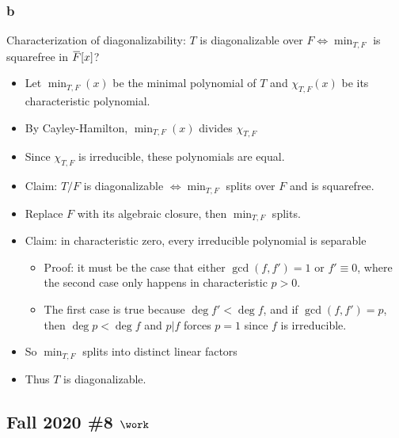 \begin{solution}
\hypertarget{b-96}{%
\subsubsection{b}\label{b-96}}

Characterization of diagonalizability: \(T\) is diagonalizable over
\(F \iff \min_{T, F}\) is squarefree in
\(\mkern 1.5mu\overline{\mkern-1.5muF\mkern-1.5mu}\mkern 1.5mu[x]\)?

\begin{itemize}
\tightlist
\item
  Let \(\min_{T, F}(x)\) be the minimal polynomial of \(T\) and
  \(\chi_{T, F}(x)\) be its characteristic polynomial.
\item
  By Cayley-Hamilton, \(\min_{T, F}(x)\) divides \(\chi_{T, F}\)
\item
  Since \(\chi_{T, F}\) is irreducible, these polynomials are equal.
\item
  Claim: \(T/F\) is diagonalizable \(\iff \min_{T, F}\) splits over
  \(F\) and is squarefree.
\item
  Replace \(F\) with its algebraic closure, then \(\min_{T, F}\) splits.
\item
  Claim: in characteristic zero, every irreducible polynomial is
  separable

  \begin{itemize}
  \tightlist
  \item
    Proof: it must be the case that either \(\gcd(f, f') = 1\) or
    \(f' \equiv 0\), where the second case only happens in
    characteristic \(p>0\).
  \item
    The first case is true because \(\deg f' < \deg f\), and if
    \(\gcd(f, f') = p\), then \(\deg p < \deg f\) and
    \(p\mathrel{\Big|}f\) forces \(p=1\) since \(f\) is irreducible.
  \end{itemize}
\item
  So \(\min_{T, F}\) splits into distinct linear factors
\item
  Thus \(T\) is diagonalizable.
\end{itemize}

\end{solution}

\hypertarget{fall-2020-8-work}{%
\subsection{\texorpdfstring{Fall 2020 \#8
\(\work\)}{Fall 2020 \#8 \textbackslash work}}\label{fall-2020-8-work}}

